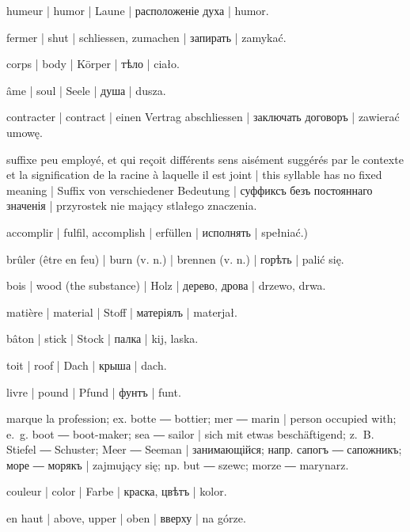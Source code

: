 \begin{ekzvocab}{1em}
 humeur | humor | Laune | расположеніе духа | humor.

 fermer | shut | schliessen, zumachen | запирать | zamykać.

 corps | body | Körper | тѣло | ciało.

 âme | soul | Seele | душа | dusza.

 contracter | contract | einen Vertrag abschliessen | заключать договоръ | zawierać umowę.

 suffixe peu employé, et qui reçoit différents sens aisément suggérés par le contexte et la signification de la racine à laquelle il est joint | this syllable has no fixed meaning | Suffix von verschiedener Bedeutung | суффиксъ безъ постояннаго значенія | przyrostek nie mający stlałego znaczenia.

\uvsubentry{} accomplir | fulfil, accomplish | erfüllen | исполнять | spełniać.)

 brûler (être en feu) | burn (v. n.) | brennen (v. n.) | горѣть | palić się.

 bois | wood (the substance) | Holz | дерево, дрова | drzewo, drwa.

 matière | material | Stoff | матеріялъ | materjał.

 bâton | stick | Stock | палка | kij, laska.

 toit | roof | Dach | крыша | dach.

 livre | pound | Pfund | фунтъ | funt.

 marque la profession; ex.  botte ―  bottier;  mer ―  marin | person occupied with; e.~g.  boot ―  boot-maker;  sea ―  sailor | sich mit etwas beschäftigend; z.~B.  Stiefel ―  Schuster;  Meer ―  Seeman | занимающійся; напр.  сапогъ ―  сапожникъ;  море ―  морякъ | zajmujący się; np.  but ―  szewc;  morze ―  marynarz.

 couleur | color | Farbe | краска, цвѣтъ | kolor.

 en haut | above, upper | oben | вверху | na górze.


\end{ekzvocab}
